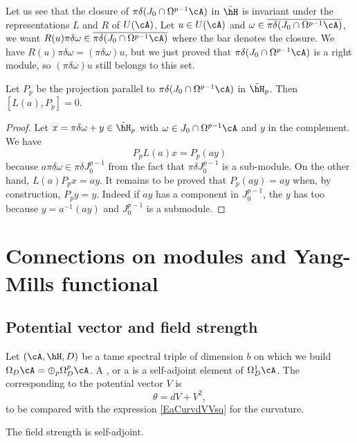Let us see that the closure of $\pi\delta(J_0\cap\Omega^{p-1}\cA)$ in $\tilde{\hH}$ is invariant under the representations $L$ and $R$ of $U(\cA)$. Let $u\in U(\cA)$ and $\omega\in \overline{ \pi\delta(J_0\cap \Omega^{p-1}\cA) }$, we want $R(u)\pi\delta\omega\in\overline{ \pi\delta(J_0\cap\Omega^{p-1}\cA) }$ where the bar denotes the closure. We have $R(u)\pi\delta\omega=(\pi\delta\omega)u$, but we just proved that $\pi\delta(J_0\cap\Omega^{p-1}\cA)$ is a right module, so $(\pi\delta\omega)u$ still belongs to this set.

\begin{proposition}
	Let $P_{p}$ be the projection parallel to $\pi\delta(J_0\cap \Omega^{p-1}\cA)$ in $\tilde{\hH}_{p}$. Then $[L(a),P_{p}]=0$.
\end{proposition}

\begin{proof}
	Let $x=\pi\delta\omega+y\in\tilde{\hH}_{p}$ with $\omega\in J_0\cap\Omega^{p-1}\cA$ and $y$ in the complement. We have
	\[
		P_{p}L(a)x=P_{p}(ay)
	\]
	because $a\pi\delta\omega\in\pi\delta J_0^{p-1}$ from the fact that $\pi\delta J_0^{p-1}$ is a sub-module. On the other hand, $L(a)P_{p}x=ay$. It remains to be proved that $P_{p}(ay)=ay$ when, by construction, $P_{p}y=y$. Indeed if  $ay$ has a component in $J_0^{p-1}$, the $y$ has too because $y=a^{-1}(ay)$ and $J_0^{p-1}$ is a submodule.
\end{proof}
\section{Connections on modules and Yang-Mills functional}

\subsection{Potential vector and field strength}

Let $(\cA,\hH,D)$ be a tame spectral triple of dimension $b$ on which we build $\Omega_D\cA=\oplus_{p}\Omega_D^{p}\cA$. A , or a  is a self-adjoint element of $\Omega_D^{1}\cA$. The  corresponding to the potential vector $V$ is
\[
	\theta=dV+V^{2},
\]
to be compared with the expression \eqref{EaCurvdVVsq} for the curvature.

\begin{proposition}
	The field strength is self-adjoint.
\end{proposition}

